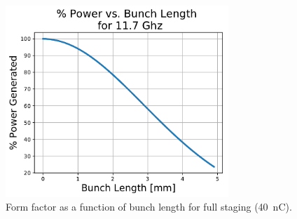 \begin{figure}
	\centering
	\includegraphics[width=0.75\textwidth]{images/formfactorsqrd}
	\caption{Form factor as a function of bunch length for full staging (\SI{40}{nC}).}
	\label{fig:form}
\end{figure}

